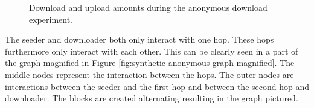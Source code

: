 \begin{figure}
\centering
{}
\caption{Download and upload amounts during the anonymous download experiment.}
\label{fig:synthetic-anonymous-amounts}
\end{figure}

The seeder and downloader both only interact with one hop.
These hops furthermore only interact with each other.
This can be clearly seen in a part of the graph magnified in Figure \ref{fig:synthetic-anonymous-graph-magnified}.
The middle nodes represent the interaction between the hops.
The outer nodes are interactions between the seeder and the first hop and between the second hop and downloader.
The blocks are created alternating resulting in the graph pictured.

